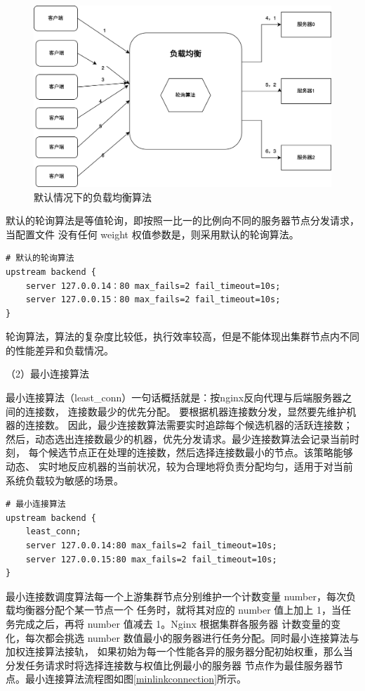 \begin{figure}[htb]
  \centering
  \includegraphics[width=\textwidth]{figures/round-robin.png}
  \caption{默认情况下的负载均衡算法}
\end{figure}

默认的轮询算法是等值轮询，即按照一比一的比例向不同的服务器节点分发请求，当配置文件
没有任何 weight 权值参数是，则采用默认的轮询算法。

\begin{lstlisting}
# 默认的轮询算法
upstream backend {
    server 127.0.0.14：80 max_fails=2 fail_timeout=10s;
    server 127.0.0.15：80 max_fails=2 fail_timeout=10s;
}
\end{lstlisting}

轮询算法，算法的复杂度比较低，执行效率较高，但是不能体现出集群节点内不同的性能差异和负载情况。

（2）最小连接算法

最小连接算法（least\_conn）一句话概括就是：按nginx反向代理与后端服务器之间的连接数，
连接数最少的优先分配\cite{周常志2023基于改进加权最小连接数的微服务负载均衡算法研究}。
要根据机器连接数分发，显然要先维护机器的连接数。
因此，最少连接数算法需要实时追踪每个候选机器的活跃连接数；
然后，动态选出连接数最少的机器，优先分发请求。最少连接数算法会记录当前时刻，
每个候选节点正在处理的连接数，然后选择连接数最小的节点。该策略能够动态、
实时地反应机器的当前状况，较为合理地将负责分配均匀，适用于对当前系统负载较为敏感的场景。

\begin{lstlisting}
# 最小连接算法
upstream backend {
    least_conn;
    server 127.0.0.14:80 max_fails=2 fail_timeout=10s;
    server 127.0.0.15:80 max_fails=2 fail_timeout=10s;
}
\end{lstlisting}

最小连接数调度算法每一个上游集群节点分别维护一个计数变量 number，每次负载均衡器分配个某一节点一个
任务时，就将其对应的 number 值上加上 1，当任务完成之后，再将 number 值减去 1。Nginx 根据集群各服务器
计数变量的变化，每次都会挑选 number 数值最小的服务器进行任务分配。同时最小连接算法与加权连接算法接轨，
如果初始为每一个性能各异的服务器分配初始权重，那么当分发任务请求时将选择连接数与权值比例最小的服务器
节点作为最佳服务器节点。最小连接算法流程图如图\ref{minlinkconnection}所示。


